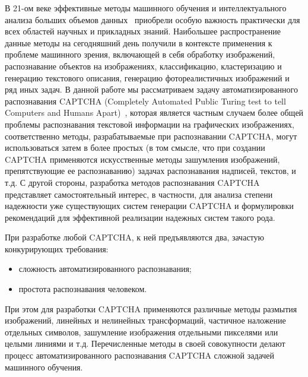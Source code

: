 \documentclass[a4paper,12pt,russian]{article} %
\begin{document}
В 21-ом веке эффективные методы машинного обучения и интеллектуального анализа больших объемов данных~\cite{michalski2013machine} приобрели особую важность практически для всех областей научных и прикладных знаний.
Наибольшее распространение данные методы на сегодняшний день получили в контексте применения к проблеме машинного зрения, включающей в себя обработку изображений, распознавание объектов на изображениях, классификацию, кластеризацию и генерацию текстового описания, генерацию фотореалистичных изображений и ряд иных задач.
В данной работе мы рассматриваем задачу автоматизированного распознавания CAPTCHA (Completely Automated Public Turing test to tell Computers and Humans Apart)~\cite{von2003captcha}, которая является частным случаем более общей проблемы распознавания текстовой информации на графических изображениях, соответственно методы, разрабатываемые при распознавании CAPTCHA, могут использоваться затем в более простых (в том смысле, что при создании CAPTCHA применяются искусственные методы зашумления изображений, препятствующие ее распознаванию) задачах распознавания надписей, текстов, и т.д.
С другой стороны, разработка методов распознавания CAPTCHA представляет самостоятельный интерес, в частности, для анализа степени надежности уже существующих систем генерации CAPTCHA и формулировки рекомендаций для эффективной реализации надежных систем такого рода.

При разработке любой CAPTCHA, к ней предъявляются два, зачастую конкурирующих требования:
\begin{itemize}
	\item сложность автоматизированного распознавания;
	\item простота распознавания человеком.
\end{itemize}
При этом для разработки CAPTCHA применяются различные методы размытия изображений, линейных и нелинейных трансформаций, частичное наложение отдельных символов, зашумление изображения отдельными пикселями или целыми линиями и т.д.
Перечисленные методы в своей совокупности делают процесс автоматизированного распознавания CAPTCHA сложной задачей машинного обучения.
\end{document}
